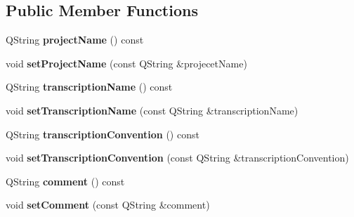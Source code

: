 \subsection*{Public Member Functions}
\begin{DoxyCompactItemize}
\item 
\mbox{\label{class_exmaralda_basic_transcription_a86c0894cea0eff62381e237e9732e74f}} 
Q\+String {\bfseries project\+Name} () const
\item 
\mbox{\label{class_exmaralda_basic_transcription_aa60a57a1ad812755e06a84b0de876b36}} 
void {\bfseries set\+Project\+Name} (const Q\+String \&projecet\+Name)
\item 
\mbox{\label{class_exmaralda_basic_transcription_af65c4389483b4dfc84fcae0d83e6da4e}} 
Q\+String {\bfseries transcription\+Name} () const
\item 
\mbox{\label{class_exmaralda_basic_transcription_a3a3f70df20b631d3e8c4591ffa38cc19}} 
void {\bfseries set\+Transcription\+Name} (const Q\+String \&transcription\+Name)
\item 
\mbox{\label{class_exmaralda_basic_transcription_aee75ddcd98f23b21a3a0684fe08240a4}} 
Q\+String {\bfseries transcription\+Convention} () const
\item 
\mbox{\label{class_exmaralda_basic_transcription_a751b55371499e2fc13cabc9fbb4df34a}} 
void {\bfseries set\+Transcription\+Convention} (const Q\+String \&transcription\+Convention)
\item 
\mbox{\label{class_exmaralda_basic_transcription_a68df5ee1f743006e97d264ff135b1095}} 
Q\+String {\bfseries comment} () const
\item 
\mbox{\label{class_exmaralda_basic_transcription_a4329b9f04c89df2c25dc4adc55c81390}} 
void {\bfseries set\+Comment} (const Q\+String \&comment)
\item 
\mbox{\label{class_exmaralda_basic_transcription_a25d2cd1fec44bff0dc008ddd9fd317c1}} 

\end{DoxyCompactItemize}
